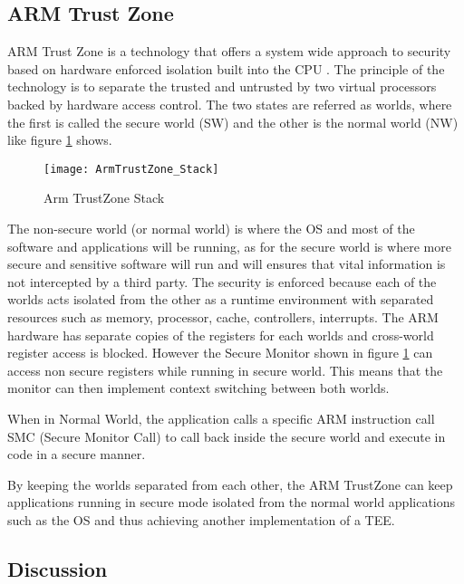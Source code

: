 \subsection{ARM Trust Zone} %
\label{ssec:arm_trust_zone}

ARM Trust Zone \cite{armtrustzone:1} is a technology that offers a system wide approach to security based on hardware enforced isolation built into the CPU \cite{armtrustzone:2}. The principle of the technology is to separate the trusted and untrusted by two virtual processors backed by hardware access control. The two states are referred as worlds, where the first is called the secure world (SW) and the other is the normal world (NW) like figure \ref{fig:armtrustzone_stack} shows.

\begin{figure}[htbp]
	\centering
	{\texttt{[image: ArmTrustZone\_Stack]}}%
	\caption{Arm TrustZone Stack \cite{armtrustzone:3}}
	\label{fig:armtrustzone_stack}
\end{figure}

The non-secure world (or normal world) is where the \gls{OS} and most of the software and applications will be running, as for the secure world is where more secure and sensitive software will run and will ensures that vital information is not intercepted by a third party. The security is enforced because each of the worlds acts isolated from the other as a runtime environment with separated resources such as memory, processor, cache, controllers, interrupts. The ARM hardware has separate copies of the registers for each worlds and cross-world register access is blocked. However the Secure Monitor shown in figure \ref{fig:armtrustzone_stack} can access non secure registers while running in secure world. This means that the monitor can then implement context switching between both worlds.

When in Normal World, the application calls a specific ARM instruction call SMC (Secure Monitor Call) to call back inside the secure world and execute in code in a secure manner.

By keeping the worlds separated from each other, the ARM TrustZone can keep applications running in secure mode isolated from the normal world applications such as the OS and thus achieving another implementation of a \gls{TEE}.

\subsection{Discussion}
\label{ssec:s2_discussion}

